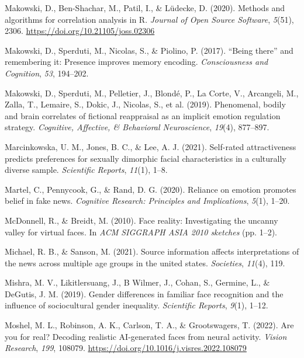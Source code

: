 \documentclass[
  man,mask,floatsintext]{apa6}
\newlength{\cslhangindent}
\newlength{\cslentryspacingunit} %
\newenvironment{CSLReferences}[2] %
 {%
  \setlength{\parindent}{0pt}
  \ifodd #1
  \let\oldpar\par
  \def\par{\hangindent=\cslhangindent\oldpar}
  \fi
  \setlength{\parskip}{#2\cslentryspacingunit}
 }%
 {}
\begin{document}
\begin{CSLReferences}{1}{0}
\leavevmode{}%
Makowski, D., Ben-Shachar, M., Patil, I., \& Lüdecke, D. (2020). Methods and algorithms for correlation analysis in {R}. \emph{Journal of Open Source Software}, \emph{5}(51), 2306. \url{https://doi.org/10.21105/joss.02306}

\leavevmode{}%
Makowski, D., Sperduti, M., Nicolas, S., \& Piolino, P. (2017). {``Being there''} and remembering it: Presence improves memory encoding. \emph{Consciousness and Cognition}, \emph{53}, 194--202.

\leavevmode{}%
Makowski, D., Sperduti, M., Pelletier, J., Blondé, P., La Corte, V., Arcangeli, M., Zalla, T., Lemaire, S., Dokic, J., Nicolas, S., et al. (2019). Phenomenal, bodily and brain correlates of fictional reappraisal as an implicit emotion regulation strategy. \emph{Cognitive, Affective, \& Behavioral Neuroscience}, \emph{19}(4), 877--897.

\leavevmode{}%
Marcinkowska, U. M., Jones, B. C., \& Lee, A. J. (2021). Self-rated attractiveness predicts preferences for sexually dimorphic facial characteristics in a culturally diverse sample. \emph{Scientific Reports}, \emph{11}(1), 1--8.

\leavevmode{}%
Martel, C., Pennycook, G., \& Rand, D. G. (2020). Reliance on emotion promotes belief in fake news. \emph{Cognitive Research: Principles and Implications}, \emph{5}(1), 1--20.

\leavevmode{}%
McDonnell, R., \& Breidt, M. (2010). Face reality: Investigating the uncanny valley for virtual faces. In \emph{ACM SIGGRAPH ASIA 2010 sketches} (pp. 1--2).

\leavevmode{}%
Michael, R. B., \& Sanson, M. (2021). Source information affects interpretations of the news across multiple age groups in the united states. \emph{Societies}, \emph{11}(4), 119.

\leavevmode{}%
Mishra, M. V., Likitlersuang, J., B Wilmer, J., Cohan, S., Germine, L., \& DeGutis, J. M. (2019). Gender differences in familiar face recognition and the influence of sociocultural gender inequality. \emph{Scientific Reports}, \emph{9}(1), 1--12.

\leavevmode{}%
Moshel, M. L., Robinson, A. K., Carlson, T. A., \& Grootswagers, T. (2022). Are you for real? Decoding realistic AI-generated faces from neural activity. \emph{Vision Research}, \emph{199}, 108079. \url{https://doi.org/10.1016/j.visres.2022.108079}


\end{CSLReferences}
\end{document}
